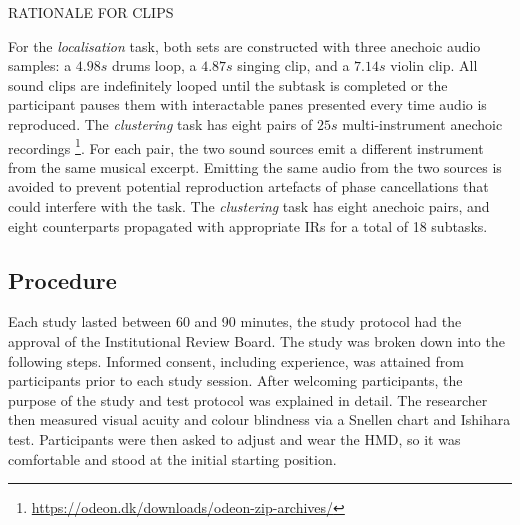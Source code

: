 RATIONALE FOR CLIPS

For the \emph{localisation} task, both sets are constructed with three anechoic audio samples: a $4.98s$ drums loop, a $4.87s$ singing clip, and a $7.14s$ violin clip. All sound clips are indefinitely looped until the subtask is completed or the participant pauses them with interactable panes presented every time audio is reproduced.
The \emph{clustering} task has eight pairs of $25s$ multi-instrument anechoic recordings \footnote{\url{https://odeon.dk/downloads/odeon-zip-archives/}}. For each pair, the two sound sources emit a different instrument from the same musical excerpt. Emitting the same audio from the two sources is avoided to prevent potential reproduction artefacts of phase cancellations that could interfere with the task. The \emph{clustering} task has eight anechoic pairs, and eight counterparts propagated with appropriate IRs for a total of 18 subtasks.

\subsection{Procedure}\label{sec:psy-procedure}
Each study lasted between 60 and 90 minutes, the study protocol had the approval of the Institutional Review Board. The study was broken down into the following steps. Informed consent, including experience, was attained from participants prior to each study session. After welcoming participants, the purpose of the study and test protocol was explained in detail. The researcher then measured visual acuity and colour blindness via a Snellen chart and Ishihara test. Participants were then asked to adjust and wear the HMD, so it was comfortable and stood at the initial starting position. 

